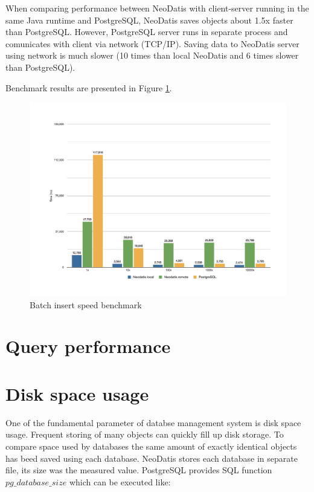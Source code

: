 \documentclass[a4paper,titlepage,12pt]{article}
\begin{document}
When comparing performance between NeoDatis with client-server running in the same Java runtime and PostgreSQL, NeoDatis saves objects about 1.5x faster than PostgreSQL. However, PostgreSQL server runs in separate process and comunicates with client via network (TCP/IP). Saving data to NeoDatis server using network is much slower (10 times than local NeoDatis and 6 times slower than PostgreSQL).

Benchmark results are presented in Figure \ref{fig:batch_insert}.


\begin{landscape}
    \begin{figure}[p]
        \includegraphics[scale=0.6]{Fig1.pdf}
        \caption{Batch insert speed benchmark}
        \label{fig:batch_insert}
    \end{figure}
\end{landscape}

\section{Query performance}\label{sec:query_performance}

\section{Disk space usage}\label{sec:disk_space_usage}
One of the fundamental parameter of databse management system is disk space usage.
Frequent storing of many objects can quickly fill up disk storage. To compare space used by databases the same amount of exactly identical objects has beed saved using each database. NeoDatis stores each database in separate file, its size was the measured value. PostgreSQL provides SQL function $pg\_database\_size$ which can be executed like:
\end{document}
